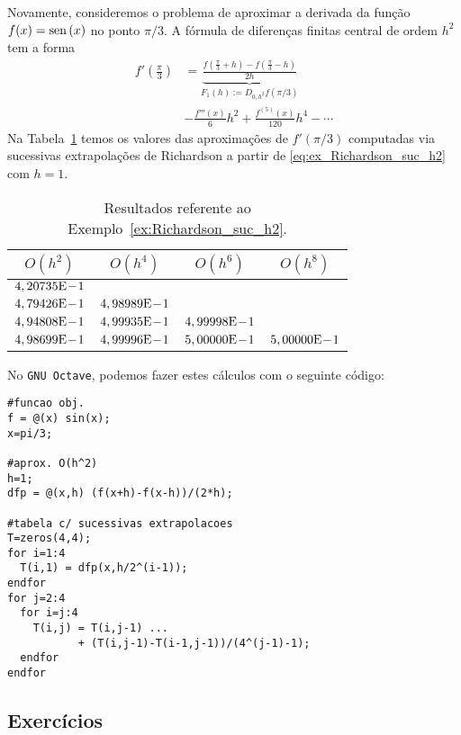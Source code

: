 \begin{ex}\label{ex:Richardson_suc_h2}
  Novamente, consideremos o problema de aproximar a derivada da função $f(x) = \operatorname{sen}\,(x)$ no ponto $\pi/3$. A fórmula de diferenças finitas central de ordem $h^2$ tem a forma
  \begin{align}
    f'\left(\frac{\pi}{3}\right) &= \underbrace{\frac{f\left(\frac{\pi}{3}+h\right)-f\left(\frac{\pi}{3}-h\right)}{2h}}_{F_1(h) := D_{0,h^2}f(\pi/3)} \nonumber\\
          &- \frac{f'''(x)}{6}h^2 + \frac{f^{(5)}(x)}{120}h^4 - \cdots \label{eq:ex_Richardson_suc_h2}
  \end{align}
Na Tabela~\ref{tab:ex_Richardson_suc_h2} temos os valores das aproximações de $f'(\pi/3)$ computadas via sucessivas extrapolações de Richardson a partir de \eqref{eq:ex_Richardson_suc_h2} com $h=1$.

\begin{table}[h!]
  \centering
  \caption{Resultados referente ao Exemplo~\ref{ex:Richardson_suc_h2}.}
  \begin{tabular}{cccc}\hline
    $O(h^2)$ & $O(h^4)$ & $O(h^6)$ & $O(h^8)$\\ \hline
    $4,20735\mathrm{E}\!-\!1$ \\
    $4,79426\mathrm{E}\!-\!1$ & $4,98989\mathrm{E}\!-\!1$ \\
    $4,94808\mathrm{E}\!-\!1$ & $4,99935\mathrm{E}\!-\!1$ & $4,99998\mathrm{E}\!-\!1$ \\
    $4,98699\mathrm{E}\!-\!1$ & $4,99996\mathrm{E}\!-\!1$ & $5,00000\mathrm{E}\!-\!1$ & $5,00000\mathrm{E}\!-\!1$ \\\hline
  \end{tabular}
  \label{tab:ex_Richardson_suc_h2}
\end{table}

\ifisoctave
No \verb+GNU Octave+, podemos fazer estes cálculos com o seguinte código:
\begin{verbatim}
#funcao obj.
f = @(x) sin(x);
x=pi/3;

#aprox. O(h^2)
h=1;
dfp = @(x,h) (f(x+h)-f(x-h))/(2*h);

#tabela c/ sucessivas extrapolacoes
T=zeros(4,4);
for i=1:4
  T(i,1) = dfp(x,h/2^(i-1));
endfor
for j=2:4
  for i=j:4
    T(i,j) = T(i,j-1) ... 
           + (T(i,j-1)-T(i-1,j-1))/(4^(j-1)-1);
  endfor
endfor
\end{verbatim}
\fi
\end{ex}

\subsection{Exercícios}

